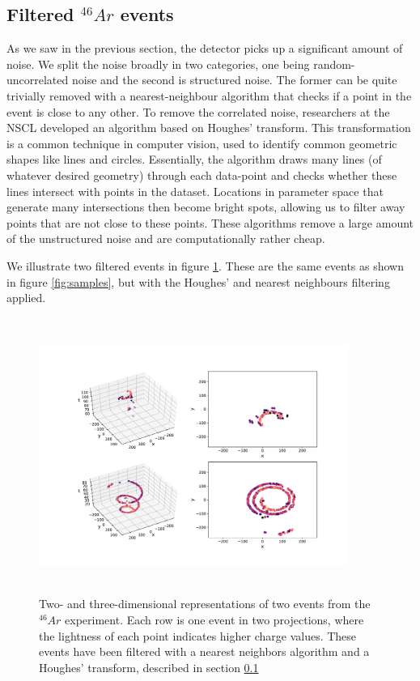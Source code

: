 \subsection{Filtered \texorpdfstring{${}^{46}Ar$}{46Ar} events}\label{sec:filtered}

As we saw in the previous section, the detector picks up a significant amount of noise. We split the noise broadly in two categories,  one being random-uncorrelated noise and the second is structured noise. The former can be quite trivially removed with a nearest-neighbour algorithm that checks if a point in the event is close to any other. To remove the correlated noise, researchers at the NSCL developed an algorithm based on Houghes' transform. This transformation is a common technique in computer vision, used to identify common geometric shapes like lines and circles. Essentially, the algorithm draws many lines (of whatever desired geometry) through each data-point and checks whether these lines intersect with points in the dataset. Locations in parameter space that generate many intersections then become bright spots, allowing us to filter away points that are not close to these points. These algorithms remove a large amount of the unstructured noise and are computationally rather cheap.

We illustrate two filtered events in figure \ref{fig:samples_filtered}. These are the same events as shown in figure \ref{fig:samples}, but with the Houghes' and nearest neighbours filtering applied. 

\begin{figure}[ht]
\centering
\includegraphics[width=0.9\textwidth, height=9cm]{../plots/display_eventsclean_.pdf}
\caption[Displaying filtered events in 2D and 3D]{Two- and three-dimensional representations of two events from the ${}^{46}Ar$ experiment. Each row is one event in two projections, where the lightness of each point indicates higher charge values. These events have been filtered with a nearest neighbors algorithm and a Houghes' transform, described in section \ref{sec:filtered}}\label{fig:samples_filtered}
\end{figure}

